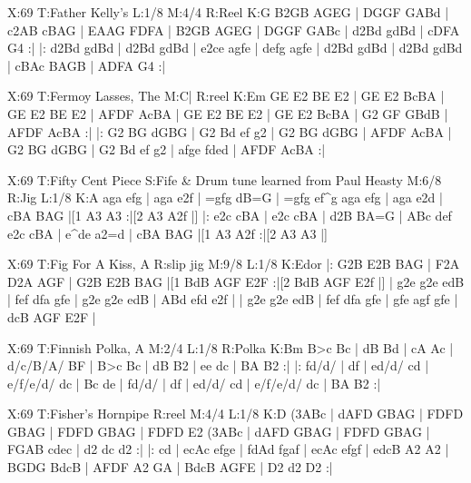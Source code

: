 \documentclass[letterpaper]{article}
\begin{document}
\begin{abc}[name]
X:69
T:Father Kelly's
L:1/8
M:4/4
R:Reel
K:G
B2GB AGEG | DGGF GABd | c2AB cBAG | EAAG FDFA |
B2GB AGEG | DGGF GABc | d2Bd gdBd | cDFA G4 :|
|: d2Bd gdBd | d2Bd gdBd | e2ce agfe | defg agfe |
d2Bd gdBd | d2Bd gdBd | cBAc BAGB | ADFA G4 :|
\end{abc}

\begin{abc}[name]
X:69
T:Fermoy Lasses, The
M:C|
R:reel
K:Em
GE E2 BE E2 | GE E2 BcBA | GE E2 BE E2 | AFDF AcBA |
GE E2 BE E2 | GE E2 BcBA | G2 GF GBdB | AFDF AcBA :|
|: G2 BG dGBG | G2 Bd ef g2 | G2 BG dGBG | AFDF AcBA |
G2 BG dGBG | G2 Bd ef g2 | afge fded | AFDF AcBA :|
\end{abc}

\begin{abc}[name]
X:69
T:Fifty Cent Piece
S:Fife & Drum tune learned from Paul Heasty
M:6/8
R:Jig
L:1/8
K:A
aga efg | aga e2f | =gfg dB=G | =gfg ef^g
aga efg | aga e2d | cBA BAG |[1 A3 A3 :|[2 A3 A2f |]
|: e2c cBA | e2c cBA | d2B BA=G | ABc def
e2c cBA | e^de a2=d | cBA BAG |[1 A3 A2f :|[2 A3 A3 |]
\end{abc}

\begin{abc}[name]
X:69
T:Fig For A Kiss, A
R:slip jig
M:9/8
L:1/8
K:Edor
|: G2B E2B BAG | F2A D2A AGF | G2B E2B BAG |[1 BdB AGF E2F :|[2 BdB AGF E2f |]
| g2e g2e edB | fef dfa gfe | g2e g2e edB | ABd efd e2f |
| g2e g2e edB | fef dfa gfe | gfe agf gfe | dcB AGF E2F |
\end{abc}

\begin{abc}[name]
X:69
T:Finnish Polka, A
M:2/4
L:1/8
R:Polka
K:Bm
B>c Bc | dB Bd | cA Ac | d/c/B/A/ BF |
B>c Bc | dB B2 | ee dc | BA B2 :|
|: fd/d/ | df | ed/d/ cd | e/f/e/d/ dc | Bc de |
fd/d/ | df | ed/d/ cd | e/f/e/d/ dc | BA B2 :|
\end{abc}

\begin{abc}[name]
X:69
T:Fisher's Hornpipe
R:reel
M:4/4
L:1/8
K:D
(3ABc | dAFD GBAG | FDFD GBAG | FDFD GBAG | FDFD E2 (3ABc |
dAFD GBAG | FDFD GBAG | FGAB cdec | d2 dc d2 :|
|: cd | ecAc efge | fdAd fgaf | ecAc efgf | edcB A2 A2 |
BGDG BdcB | AFDF A2 GA |  BdcB  AGFE | D2 d2 D2 :|
\end{abc}
\end{document}
